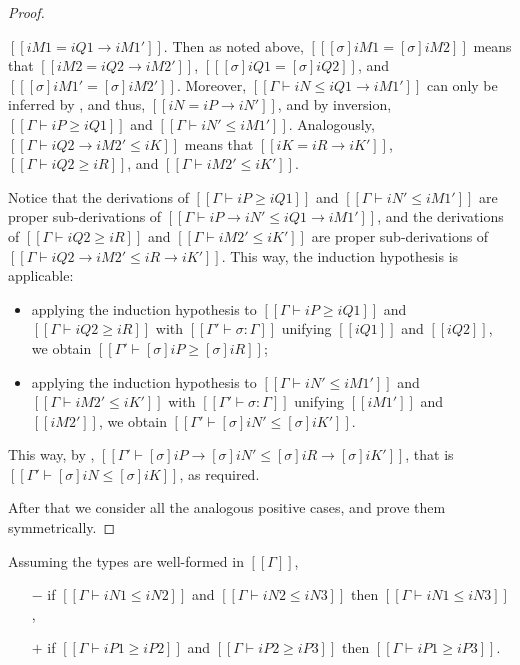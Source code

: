\begin{corollary}
\begin{proof}
\begin{caseof}
    \item $[[iM1 = iQ1 → iM1']]$. Then as noted above, 
      $[[ [σ]iM1 = [σ]iM2 ]]$ means that $[[iM2 = iQ2 → iM2']]$, $[[ [σ]iQ1 = [σ]iQ2 ]]$, and $[[ [σ]iM1' = [σ]iM2' ]]$.
      Moreover, $[[Γ ⊢ iN ≤ iQ1 → iM1']]$ can only be inferred by ,
      and thus, $[[iN = iP → iN']]$, and by inversion, $[[Γ ⊢ iP ≥ iQ1]]$ and $[[Γ ⊢ iN' ≤ iM1']]$.
      Analogously, $[[Γ ⊢ iQ2 → iM2' ≤ iK]]$ means that $[[iK = iR → iK']]$, $[[Γ ⊢ iQ2 ≥ iR]]$, and $[[Γ ⊢ iM2' ≤ iK']]$.

      Notice that the derivations of $[[Γ ⊢ iP ≥ iQ1]]$ and $[[Γ ⊢ iN' ≤ iM1']]$ are proper sub-derivations of
      $[[Γ ⊢ iP → iN' ≤ iQ1 → iM1']]$, and the derivations of $[[Γ ⊢ iQ2 ≥ iR]]$ and $[[Γ ⊢ iM2' ≤ iK']]$ are proper sub-derivations of
      $[[Γ ⊢ iQ2 → iM2' ≤ iR → iK']]$. This way, the induction hypothesis is applicable:
      \begin{itemize}
        \item applying the induction hypothesis to $[[Γ ⊢ iP ≥ iQ1]]$ and $[[Γ ⊢ iQ2 ≥ iR]]$ 
          with $[[Γ' ⊢ σ : Γ]]$ unifying $[[iQ1]]$ and $[[iQ2]]$, we obtain $[[Γ' ⊢ [σ]iP ≥ [σ]iR]]$;
        \item applying the induction hypothesis to $[[Γ ⊢ iN' ≤ iM1']]$ and $[[Γ ⊢ iM2' ≤ iK']]$ 
          with $[[Γ' ⊢ σ : Γ]]$ unifying $[[iM1']]$ and $[[iM2']]$, we obtain $[[Γ' ⊢ [σ]iN' ≤ [σ]iK']]$.
      \end{itemize}
      This way, by , $[[Γ' ⊢ [σ]iP → [σ]iN' ≤ [σ]iR → [σ]iK']]$,
      that is $[[Γ' ⊢ [σ]iN ≤ [σ]iK]]$, as required.
  \end{caseof}

  After that we consider all the 
  analogous positive cases, and prove them symmetrically.
\end{proof}

\begin{corollary} \label{corollary:subtyping-transitivity}
  Assuming the types are well-formed in $[[Γ]]$,
  \begin{itemize}
    \item[$-$] if $[[Γ ⊢ iN1 ≤ iN2]]$ and $[[Γ ⊢ iN2 ≤ iN3]]$ then $[[Γ ⊢ iN1 ≤ iN3]]$,
    \item[$+$] if $[[Γ ⊢ iP1 ≥ iP2]]$ and $[[Γ ⊢ iP2 ≥ iP3]]$ then $[[Γ ⊢ iP1 ≥ iP3]]$.
  \end{itemize}
\end{corollary}


\end{corollary}
